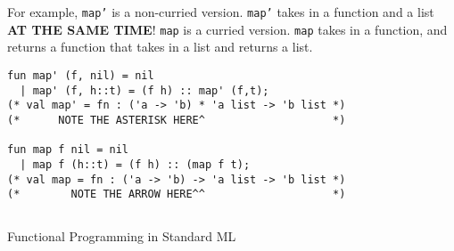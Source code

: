 For example, \texttt{map'} is a non-curried version.
\texttt{map'} takes in a function and a list \textbf{AT THE SAME TIME}!
\texttt{map} is a curried version.
\texttt{map} takes in a function, and returns a function that takes in a list and returns a list.

\begin{verbatim}
fun map' (f, nil) = nil
  | map' (f, h::t) = (f h) :: map' (f,t);
(* val map' = fn : ('a -> 'b) * 'a list -> 'b list *)
(*      NOTE THE ASTERISK HERE^                    *)

fun map f nil = nil
  | map f (h::t) = (f h) :: (map f t);       
(* val map = fn : ('a -> 'b) -> 'a list -> 'b list *)
(*        NOTE THE ARROW HERE^^                    *)
\end{verbatim}

\subsection{}
Functional Programming in Standard ML

